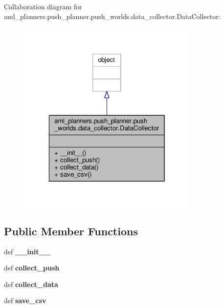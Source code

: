 Collaboration diagram for aml\-\_\-planners.\-push\-\_\-planner.\-push\-\_\-worlds.\-data\-\_\-collector.\-Data\-Collector\-:\nopagebreak
\begin{figure}[H]
\begin{center}
\leavevmode
\includegraphics[width=256pt]{classaml__planners_1_1push__planner_1_1push__worlds_1_1data__collector_1_1_data_collector__coll__graph}
\end{center}
\end{figure}
\subsection*{Public Member Functions}
\begin{DoxyCompactItemize}
\item 
\hypertarget{classaml__planners_1_1push__planner_1_1push__worlds_1_1data__collector_1_1_data_collector_a86fd32e75f37821ed8ad6ff8b8e32e9b}{def {\bfseries \-\_\-\-\_\-init\-\_\-\-\_\-}}\label{classaml__planners_1_1push__planner_1_1push__worlds_1_1data__collector_1_1_data_collector_a86fd32e75f37821ed8ad6ff8b8e32e9b}

\item 
\hypertarget{classaml__planners_1_1push__planner_1_1push__worlds_1_1data__collector_1_1_data_collector_a002d570ea57f311e7ce76bd69eb5bc02}{def {\bfseries collect\-\_\-push}}\label{classaml__planners_1_1push__planner_1_1push__worlds_1_1data__collector_1_1_data_collector_a002d570ea57f311e7ce76bd69eb5bc02}

\item 
\hypertarget{classaml__planners_1_1push__planner_1_1push__worlds_1_1data__collector_1_1_data_collector_a3c24be2cd11e1775647048c1081a483c}{def {\bfseries collect\-\_\-data}}\label{classaml__planners_1_1push__planner_1_1push__worlds_1_1data__collector_1_1_data_collector_a3c24be2cd11e1775647048c1081a483c}

\item 
\hypertarget{classaml__planners_1_1push__planner_1_1push__worlds_1_1data__collector_1_1_data_collector_aba3ef12124528c6bca247a8fe1c93e16}{def {\bfseries save\-\_\-csv}}\label{classaml__planners_1_1push__planner_1_1push__worlds_1_1data__collector_1_1_data_collector_aba3ef12124528c6bca247a8fe1c93e16}

\end{DoxyCompactItemize}


